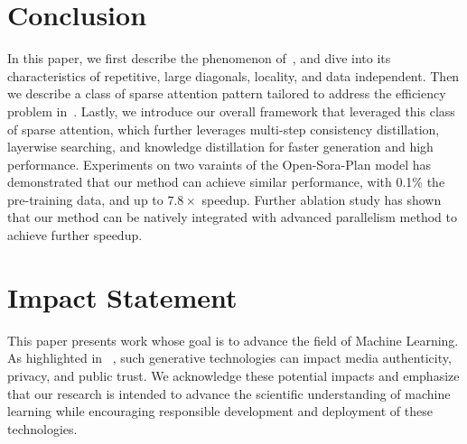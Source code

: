 \section{Conclusion}
In this paper, we first describe the phenomenon of~\patternname, and dive into its characteristics of repetitive, large diagonals, locality, and data independent. Then we describe a class of sparse attention pattern tailored to address the efficiency problem in~\patternname. Lastly, we introduce our overall framework that leveraged this class of sparse attention, which further leverages multi-step consistency distillation, layerwise searching, and knowledge distillation for faster generation and high performance. Experiments on two varaints of the Open-Sora-Plan model has demonstrated that our method can achieve similar performance, with 0.1\% the pre-training data, and up to $7.8\times$ speedup. Further ablation study has shown that our method can be natively integrated with advanced parallelism method to achieve further speedup.

\section{Impact Statement}

This paper presents work whose goal is to advance the field
of Machine Learning. As highlighted in ~\citep{mirsky2020creation}, such generative technologies can impact media authenticity, privacy, and public trust. We acknowledge these potential impacts and emphasize that our research is intended to advance the scientific understanding of machine learning while encouraging responsible development and deployment of these technologies.

